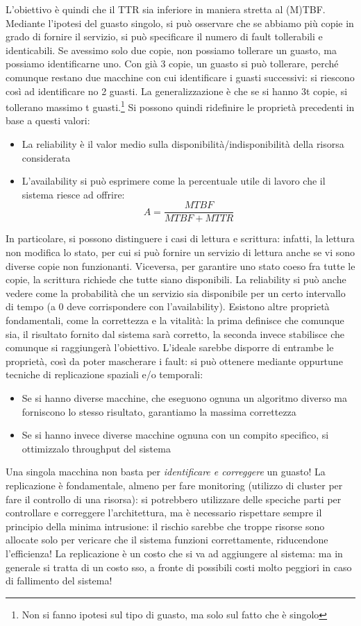 L'obiettivo è quindi che il TTR sia inferiore in maniera stretta al (M)TBF.
Mediante l'ipotesi del guasto singolo, si può osservare che se abbiamo più copie in grado di fornire il servizio, si
può specificare il numero di fault tollerabili e identicabili. Se avessimo solo due copie, non possiamo tollerare un
guasto, ma possiamo identificarne uno. Con già 3 copie, un guasto si può tollerare,
perché comunque restano due macchine con cui identificare i guasti successivi:
si riescono così ad identificare no 2 guasti. La generalizzazione è che se si hanno 3t copie, si tollerano massimo t
guasti.\footnote{Non si fanno ipotesi sul tipo di guasto, ma solo sul fatto che è singolo} Si possono quindi
ridefinire le proprietà precedenti in base a questi valori:
\begin{itemize}
 \item La reliability è il valor medio sulla disponibilità/indisponibilità della risorsa considerata
 \item L'availability si può esprimere come la percentuale utile di lavoro che il sistema riesce ad offrire:
 \begin{equation}
  A = \frac{MTBF}{MTBF + MTTR}
 \end{equation}
\end{itemize}
In particolare, si possono distinguere i casi di lettura e scrittura: infatti, la lettura non modifica lo stato, per
cui si può fornire un servizio di lettura anche se vi sono diverse copie non funzionanti. Viceversa, per garantire uno
stato coeso fra tutte le copie, la scrittura richiede che tutte siano disponibili.
La reliability si può anche vedere come la probabilità che un servizio sia disponibile per un certo intervallo di 
tempo (a 0 deve corrispondere con l'availability).
Esistono altre proprietà fondamentali, come la correttezza e la vitalità: la prima definisce che comunque sia, il
risultato fornito dal sistema sarà corretto, la seconda invece stabilisce che comunque si raggiungerà l'obiettivo.
L'ideale sarebbe disporre di entrambe le proprietà, così da poter mascherare i fault: si può ottenere mediante 
oppurtune tecniche di replicazione spaziali e/o temporali:
\begin{itemize}
 \item Se si hanno diverse macchine, che eseguono ognuna un algoritmo diverso ma forniscono lo stesso risultato,
 garantiamo la massima correttezza
 \item Se si hanno invece diverse macchine ognuna con un compito specifico, si ottimizzalo throughput del sistema
\end{itemize}
Una singola macchina non basta per \textit{identificare e correggere} un guasto! La replicazione è fondamentale,
almeno per fare monitoring (utilizzo di cluster per fare il controllo di una risorsa): si potrebbero utilizzare delle
speciche parti per controllare e correggere l'architettura, ma è necessario rispettare sempre il principio della minima
intrusione: il rischio sarebbe che troppe risorse sono allocate solo per vericare che il sistema funzioni correttamente,
riducendone l'efficienza! La replicazione è un costo che si va ad aggiungere al sistema: ma in generale si tratta di un
costo sso, a fronte di possibili costi molto peggiori in caso di fallimento del sistema!
